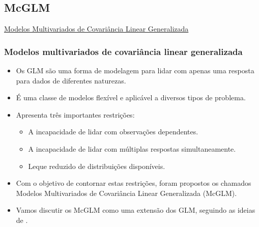 \documentclass[10pt,
  aspectratio=169,
  serif,
  mathserif,
  professionalfont,
  compress,
  handout,
  ]{beamer}\usepackage[]{graphicx}\usepackage[]{color}
\begin{document}
\subsection{McGLM}


\begin{frame}[c, allowframebreaks]

\begin{center}

  {\normalsize \href{https://lineu96.github.io/st/}{Modelos Multivariados de Covariância Linear Generalizada}}
  
\end{center}

\end{frame}


\begin{frame}
  \frametitle{Modelos multivariados de covariância linear generalizada}
  \begin{itemize}
    \itemsep 2ex
  
  \item Os GLM são uma forma de modelagem para lidar com apenas uma resposta para dados de diferentes naturezas.  
  
  \item É uma classe de modelos flexível e aplicável a diversos tipos de problema.  
  
  \item Apresenta três importantes restrições:
    \begin{itemize}
      \item A incapacidade de lidar com observações dependentes. 
      \item A incapacidade de lidar com múltiplas respostas simultaneamente.
      \item Leque reduzido de distribuições disponíveis. 
    \end{itemize}

  \item Com o objetivo de contornar estas restrições, foram propostos os chamados Modelos Multivariados de Covariância Linear Generalizada (McGLM).
  
  \item Vamos discutir os McGLM como uma extensão dos GLM, seguindo as ideias de \cite{Bonat16} . 
  
  \end{itemize}
\end{frame}
\end{document}
